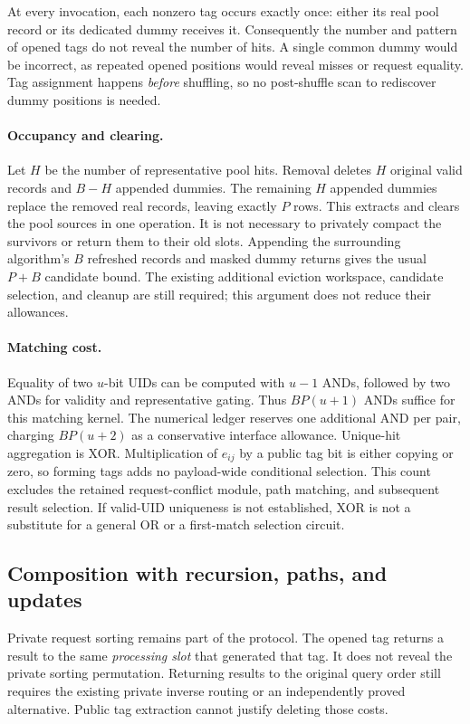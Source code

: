 At every invocation, each nonzero tag occurs exactly once: either its real
pool record or its dedicated dummy receives it.  Consequently the number
and pattern of opened tags do not reveal the number of hits.  A single
common dummy would be incorrect, as repeated opened positions would reveal
misses or request equality.  Tag assignment happens \emph{before} shuffling,
so no post-shuffle scan to rediscover dummy positions is needed.

\paragraph{Occupancy and clearing.}
Let $H$ be the number of representative pool hits.  Removal deletes $H$
original valid records and $B-H$ appended dummies.  The remaining $H$
appended dummies replace the removed real records, leaving exactly $P$
rows.  This extracts and clears the pool sources in one operation.  It is
not necessary to privately compact the survivors or return them to their
old slots.  Appending the surrounding algorithm's $B$ refreshed records
and masked dummy returns gives the usual $P+B$ candidate bound.  The
existing additional eviction workspace, candidate selection, and cleanup
are still required; this argument does not reduce their allowances.

\paragraph{Matching cost.}
Equality of two $u$-bit UIDs can be computed with $u-1$ ANDs, followed by
two ANDs for validity and representative gating.  Thus $BP(u+1)$ ANDs suffice
for this matching kernel.  The numerical ledger reserves one additional
AND per pair, charging $BP(u+2)$ as a conservative interface allowance.
Unique-hit aggregation is XOR.  Multiplication
of $e_{ij}$ by a public tag bit is either copying or zero, so forming tags
adds no payload-wide conditional selection.  This count excludes the
retained request-conflict module, path matching, and subsequent result
selection.  If valid-UID uniqueness is not established, XOR is not a
substitute for a general OR or a first-match selection circuit.

\subsection{Composition with recursion, paths, and updates}

Private request sorting remains part of the protocol.  The opened tag
returns a result to the same \emph{processing slot} that generated that tag.
It does not reveal the private sorting permutation.  Returning results to
the original query order still requires the existing private inverse
routing or an independently proved alternative.  Public tag extraction
cannot justify deleting those costs.

